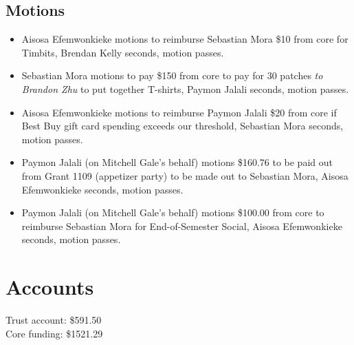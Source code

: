 \documentclass[12pt]{article}
\begin{document}
\subsection*{Motions}
\begin{itemize}
\item Aisosa Efemwonkieke motions to reimburse Sebastian Mora \$10 from core for Timbits, Brendan Kelly seconds, motion passes.
\item Sebastian Mora motions to pay \$150 from core to pay for 30 patches \textit{to Brandon Zhu} to put together T-shirts, Paymon Jalali seconds, motion passes.
\item Aisosa Efemwonkieke motions to reimburse Paymon Jalali \$20 from core if Best Buy gift card spending exceeds our threshold, Sebastian Mora seconds, motion passes.
\item Paymon Jalali (on Mitchell Gale's behalf) motions \$160.76 to be paid out from Grant 1109 (appetizer party) to be made out to Sebastian Mora, Aisosa Efemwonkieke seconds, motion passes.
\item Paymon Jalali (on Mitchell Gale's behalf) motions \$100.00 from core to reimburse Sebastian Mora for End-of-Semester Social, Aisosa Efemwonkieke seconds, motion passes.
\end{itemize}

\section*{Accounts}

Trust account: \$591.50 \\
Core funding: \$1521.29 \\
\end{document}
